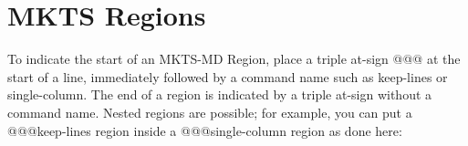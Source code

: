
\begin{multicols}{2}\mktsShowpar\par
\end{multicols}
\section{MKTS Regions 
}
\begin{multicols}{2}To indicate the start of an MKTS-MD Region, place a triple at-sign {\mktsStyleCode{}@@@}
at the start of a line, immediately followed by a command name such as
{\mktsStyleCode{}keep-lines} or {\mktsStyleCode{}single-column}. The end of a region is indicated by a
triple at-sign without a command name. Nested regions are possible; for example,
you can put a {\mktsStyleCode{}@@@keep-lines} region inside a {\mktsStyleCode{}@@@single-column} region as
done here:\mktsShowpar\par
\end{multicols}
